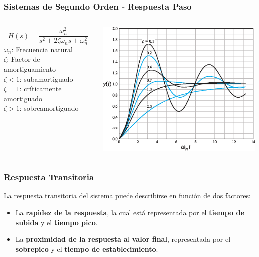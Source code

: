 \documentclass[aspectratio=169,handout]{beamer}
\theoremstyle{definition}
\theoremstyle{plain}
\theoremstyle{remark}
\begin{document}
\begin{frame}[<-+>]\frametitle{Sistemas de Segundo Orden - Respuesta Paso}
\vspace*{3mm}
\begin{columns}
 \begin{column}{0.3\textwidth}
  \begin{equation*}
    H(s) = \frac{\omega_n^2}{s^2 + 2 \zeta \omega_n s + \omega_n^2}
  \end{equation*}
  $\omega_n$: Frecuencia natural\\
  $\zeta$: Factor de amortiguamiento\\
  \vspace*{5mm}
  $\zeta < 1$: subamortiguado\\
  $\zeta = 1$: críticamente amortiguado\\
  $\zeta > 1$: sobreamortiguado

 \end{column} 
 \begin{column}{0.7\textwidth}
  \centering
  \includegraphics[width=9cm]{images/secondOrderResponse.eps}
 \end{column} 
\end{columns}
\end{frame}

\begin{frame}[<-+>]\frametitle{Respuesta Transitoria}
  La respuesta transitoria del sistema puede describirse en función de dos factores:
  \begin{itemize}
    \item La \textbf{rapidez de la respuesta}, la cual está representada por el \textbf{tiempo de subida} y el \textbf{tiempo pico}.
    \item La \textbf{proximidad de la respuesta al valor final}, representada por el \textbf{sobrepico} y el \textbf{tiempo de establecimiento}.
  \end{itemize}
\end{frame}
\end{document}
